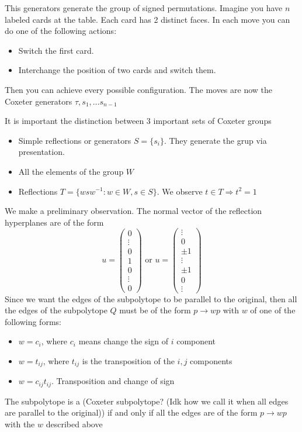\documentclass[leqno]{article}
\numberwithin{equation}{section}
\numberwithin{theorem}{section}
\begin{document}
This generators generate the group of signed permutations. Imagine you have $n$ labeled cards at the table. Each card has 2 distinct faces. In each move you can do one of the following actions:
 \begin{itemize}[topsep=-6pt, itemsep=0pt]
  \item Switch the first card.
  \item Interchange the position of two cards and switch them.
\end{itemize}
Then you can achieve every possible configuration. The moves are now the Coxeter generators $\tau , s_1, \ldots s_{n-1}$

It is important the distinction between $3$ important sets of Coxeter groups
\begin{itemize}[topsep=-6pt, itemsep=0pt]
  \item Simple reflections or generators  $S = \{s_i\}$. They generate the grup via presentation.
  \item All the elements of the group $W$
  \item Reflections $T = \{wsw^{-1}: w\in W, s\in S\}$. We observe $t\in T \Rightarrow t^2 = 1$
\end{itemize}

We make a preliminary observation. The normal vector of the reflection hyperplanes are of the form
\[
u = \begin{pmatrix} 0 \\ \vdots \\ 0 \\ 1 \\ 0 \\\vdots\\0 \end{pmatrix} \text{ or } u = \begin{pmatrix} \vdots \\ 0  \\ \pm 1 \\ \vdots  \\ \pm 1\\ 0\\ \vdots \end{pmatrix} 
\] 
Since we want the edges of the subpolytope to be parallel to the original, then all the edges of the subpolytope $Q$ must be of the form $p \rightarrow wp$ with $w$ of one of the following forms:
 \begin{itemize}[topsep=-6pt, itemsep=0pt]
  \item $w = c_i$, where  $c_i$ means change the sign of  $i$ component
  \item  $w = t_{ij}$, where $t_{ij}$ is the transposition of the $i, j$ components
  \item  $w = c_{ij}t_{ij}$. Transposition and change of sign
\end{itemize}

The subpolytope is a (Coxeter subpolytope? (Idk how we call it when all edges are parallel to the original)) if and only if all the edges are of the form $p \rightarrow wp$ with the $w$ described above
\end{document}
